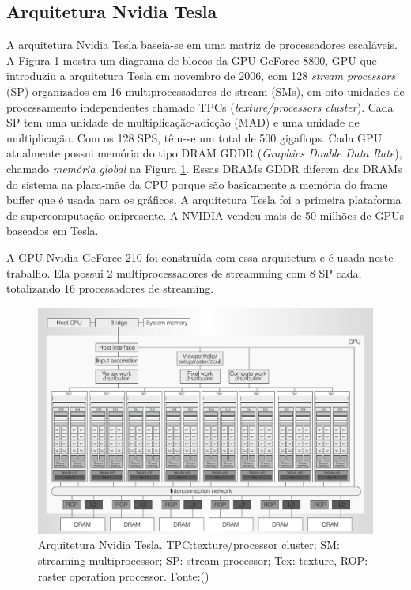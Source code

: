 \subsection{Arquitetura Nvidia Tesla}
A arquitetura Nvidia Tesla baseia-se em uma matriz de processadores escaláveis. A Figura  \ref{fig:tesla} mostra um diagrama de blocos da GPU GeForce 8800, GPU que introduziu a arquitetura Tesla em novembro de 2006, com 128 \textit{stream processors} (SP) organizados em 16 multiprocessadores de stream (SMs), em oito unidades de processamento independentes chamado TPCs (\textit{texture/processors cluster}). Cada SP tem uma unidade de multiplicação-adicção (MAD) e uma unidade de multiplicação. Com os 128 SPS, têm-se um total de 500  gigaflops. 
Cada GPU atualmente possui memória do tipo DRAM GDDR (\textit{Graphics Double Data Rate}), chamado \textit{memória global} na Figura \ref{fig:tesla}. Essas DRAMs GDDR diferem das DRAMs do sistema na placa-mãe da CPU porque são basicamente a memória do frame buffer que é usada para os gráficos.  A arquitetura Tesla foi a primeira plataforma de supercomputação onipresente. A NVIDIA vendeu mais de 50 milhões de GPUs baseados em Tesla. 

A GPU Nvidia GeForce 210 foi construída com essa arquitetura e é usada neste trabalho. Ela possui 2 multiprocessadores de streamming com 8 SP cada, totalizando 16 processadores de streaming.


\FloatBarrier
\begin{figure}[!ht]
\centering
\includegraphics[width=12cm]{tesla.png}
\caption{Arquitetura Nvidia Tesla. TPC:texture/processor cluster; SM: streaming multiprocessor; SP: stream processor; Tex: texture, ROP: raster operation processor. Fonte:(\cite{NvidiaTesla})}
\label{fig:tesla}
\end{figure}
\FloatBarrier

